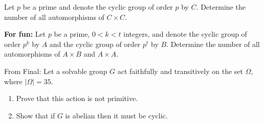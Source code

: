 \documentclass{article}
\begin{document}
\begin{homeworkProblem}
    Let $p$ be a prime and denote the cyclic group of order $p$ by $C$. 
    Determine the number of all automorphisms of $C \times C$.

\end{homeworkProblem}

\pagebreak

\begin{homeworkProblem}
    \textbf{For fun:} Let $p$ be a prime, $0 < k < t$ integers,
    and denote the cyclic group of order $p^k$ by $A$
    and the cyclic group of order $p^t$ by $B$. Determine the 
    number of all automorphisms of $A \times B$ and $A \times A$.
    
\end{homeworkProblem}

\pagebreak

\begin{homeworkProblem}
    From Final: Let a solvable group $G$ act faithfully and
    transitively on the set $\Omega$, where $\lvert \Omega \rvert = 35$.
    \begin{enumerate}
        \item Prove that this action is not primitive.
        \item Show that if $G$ is abelian then it must be cyclic.
    \end{enumerate}
    
\end{homeworkProblem}
\end{document}
